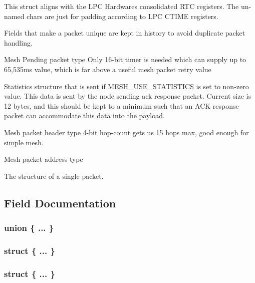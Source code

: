 This struct aligns with the L\+PC Hardware\textquotesingle{}s consolidated R\+TC registers. The un-\/named chars are just for padding according to L\+PC C\+T\+I\+ME registers.

Fields that make a packet unique are kept in history to avoid duplicate packet handling.

Mesh Pending packet type Only 16-\/bit timer is needed which can supply up to 65,535ms value, which is far above a useful mesh packet retry value

Statistics structure that is sent if M\+E\+S\+H\+\_\+\+U\+S\+E\+\_\+\+S\+T\+A\+T\+I\+S\+T\+I\+CS is set to non-\/zero value. This data is sent by the node sending ack response packet. Current size is 12 bytes, and this should be kept to a minimum such that an A\+CK response packet can accommodate this data into the payload.

Mesh packet header type 4-\/bit hop-\/count gets us 15 hops max, good enough for simple mesh.

Mesh packet address type

The structure of a single packet. 

\subsection{Field Documentation}
\subsubsection[{\texorpdfstring{"@61}{@61}}]{\setlength{\rightskip}{0pt plus 5cm}union \{ ... \} }\hypertarget{struct____attribute_____a508ec0f55791b0b9597cd76c90350628}{}\label{struct____attribute_____a508ec0f55791b0b9597cd76c90350628}
\subsubsection[{\texorpdfstring{"@64}{@64}}]{\setlength{\rightskip}{0pt plus 5cm}struct \{ ... \} }\hypertarget{struct____attribute_____abe87e0591ebdd65a429a6b6c95f1439b}{}\label{struct____attribute_____abe87e0591ebdd65a429a6b6c95f1439b}
\subsubsection[{\texorpdfstring{"@66}{@66}}]{\setlength{\rightskip}{0pt plus 5cm}struct \{ ... \} }\hypertarget{struct____attribute_____ad7a1d9ea5fa4ffe405adf790c173b67a}{}\label{struct____attribute_____ad7a1d9ea5fa4ffe405adf790c173b67a}
